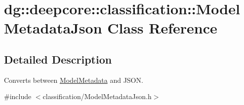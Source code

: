 \hypertarget{classdg_1_1deepcore_1_1classification_1_1_model_metadata_json}{}\section{dg\+:\+:deepcore\+:\+:classification\+:\+:Model\+Metadata\+Json Class Reference}
\label{classdg_1_1deepcore_1_1classification_1_1_model_metadata_json}


\subsection{Detailed Description}
Converts between \hyperlink{classdg_1_1deepcore_1_1classification_1_1_model_metadata}{Model\+Metadata} and J\+S\+ON. 

{\ttfamily \#include $<$classification/\+Model\+Metadata\+Json.\+h$>$}


